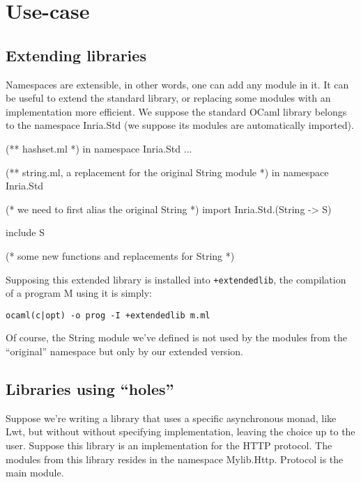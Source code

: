 \documentclass[11pt,a4paper]{article}
\begin{document}
\section{Use-case}

\subsection{Extending libraries}

Namespaces are extensible, in other words, one can add any module in it. It can
be useful to extend the standard library, or replacing some modules with an
implementation more efficient. We suppose the standard OCaml library belongs to
the namespace Inria.Std (we suppose its modules are automatically
imported).

\begin{OCaml}
(** hashset.ml *)
in namespace Inria.Std
...
\end{OCaml}

\begin{OCaml}
(** string.ml, a replacement for the original String module *)
in namespace Inria.Std

(* we need to first alias the original String *)
import Inria.Std.(String -> S)

include S

(* some new functions and replacements for String *)
\end{OCaml}

Supposing this extended library is installed into \texttt{+extendedlib}, the
compilation of a program M using it is simply:
\begin{verbatim}
ocaml(c|opt) -o prog -I +extendedlib m.ml
\end{verbatim}

Of course, the String module we've defined is not used by the modules from the
``original'' namespace but only by our extended version.

\subsection{Libraries using ``holes''}

Suppose we're writing a library that uses a specific asynchronous monad, like
Lwt, but without without specifying implementation, leaving the choice up to the
user. Suppose this library is an implementation for the HTTP protocol. The modules
from this library resides in the namespace Mylib.Http. Protocol is the main module.
\end{document}
